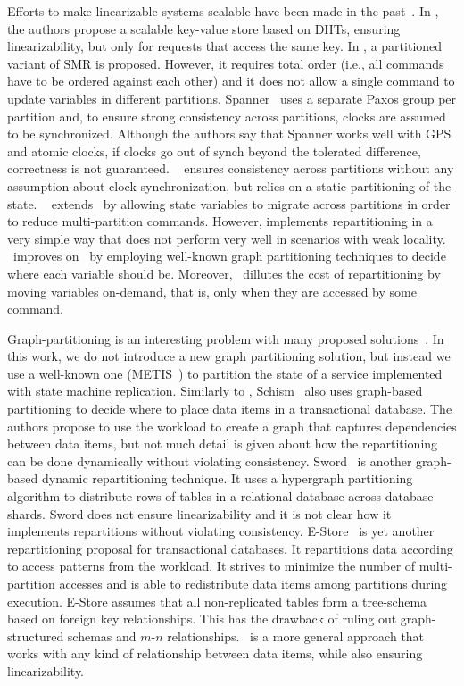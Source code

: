 Efforts to make linearizable systems scalable have been made in the past~\cite{corbett2013spanner, bezerra2014ssmr, hoang2016, Glendenning2011, Marandi11}.
In \cite{Glendenning2011}, the authors propose a scalable key-value store based on DHTs, ensuring linearizability, but only for requests that access the same key. 
In \cite{Marandi11}, a partitioned variant of SMR is proposed.
However, it requires total order (i.e., all commands have to be ordered against each other) and it does not allow a single command to update variables in different partitions.
Spanner~\cite{corbett2013spanner} uses a separate Paxos group per partition and, to ensure strong consistency across partitions, clocks are assumed to be synchronized.
Although the authors say that Spanner works well with GPS and atomic clocks, if clocks go out of synch beyond the tolerated difference, correctness is not guaranteed.
\ssmr{}~\cite{bezerra2014ssmr} ensures consistency across partitions without any assumption about clock synchronization, but relies on a static partitioning of the state.
\dssmr{}~\cite{hoang2016} extends \dssmr\ by allowing state variables to migrate across partitions in order to reduce multi-partition commands.
However, \dssmr{} implements repartitioning in a very simple way that does not perform very well in scenarios with weak locality.
\dynastar\ improves on \dssmr\ by employing well-known graph partitioning techniques to decide where each variable should be.
Moreover, \dynastar\ dillutes the cost of repartitioning by moving variables on-demand, that is, only when they are accessed by some command.

Graph-partitioning is an interesting problem with many proposed solutions~\cite{Abou-Rjeili:2006,kernighan1970efficient,hendrickson2000graph}.
In this work, we do not introduce a new graph partitioning solution, but instead we use a well-known one (METIS~\cite{Abou-Rjeili:2006}) to partition the state of a service implemented with state machine replication.
Similarly to \dynastar{}, Schism~\cite{curino2010sch} also uses graph-based partitioning to decide where to place data items in a transactional database.
The authors propose to use the workload to create a graph that captures dependencies between data items, but not much detail is given about how the repartitioning can be done dynamically without violating consistency.
Sword~\cite{quamar2013sword} is another graph-based dynamic repartitioning technique.
It uses a hypergraph partitioning algorithm to distribute rows of tables in a relational database across database shards.
Sword does not ensure linearizability and it is not clear how it implements repartitions without violating consistency.
E-Store~\cite{taft2014est} is yet another repartitioning proposal for transactional databases.
It repartitions data according to access patterns from the workload.
It strives to minimize the number of multi-partition accesses and is able to redistribute data items among partitions during execution.
E-Store assumes that all non-replicated tables form a tree-schema based on foreign key relationships.
This has the drawback of ruling out graph-structured schemas and \mbox{$m$-$n$} relationships.
\dynastar\ is a more general approach that works with any kind of relationship between data items, while also ensuring linearizability.

